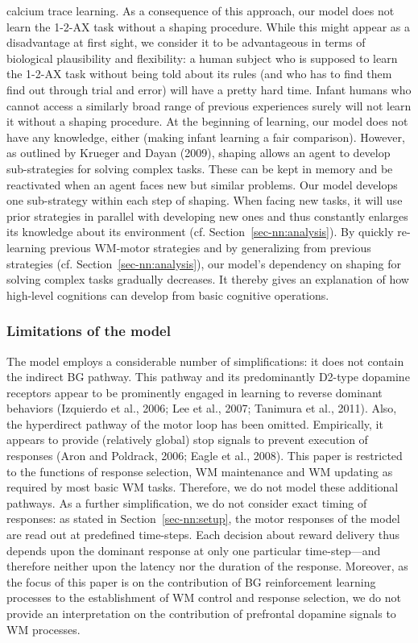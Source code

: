 \documentclass[
  11pt,
  a4paper,
]{scrbook}
\begin{document}
calcium trace learning. As a consequence of this approach, our model
does not learn the 1-2-AX task without a shaping procedure. While this
might appear as a disadvantage at first sight, we consider it to be
advantageous in terms of biological plausibility and flexibility: a
human subject who is supposed to learn the 1-2-AX task without being
told about its rules (and who has to find them find out through trial
and error) will have a pretty hard time. Infant humans who cannot access
a similarly broad range of previous experiences surely will not learn it
without a shaping procedure. At the beginning of learning, our model
does not have any knowledge, either (making infant learning a fair
comparison). However, as outlined by Krueger and Dayan (2009), shaping
allows an agent to develop sub-strategies for solving complex tasks.
These can be kept in memory and be reactivated when an agent faces new
but similar problems. Our model develops one sub-strategy within each
step of shaping. When facing new tasks, it will use prior strategies in
parallel with developing new ones and thus constantly enlarges its
knowledge about its environment (cf. Section~\ref{sec-nn:analysis}). By
quickly re-learning previous WM-motor strategies and by generalizing
from previous strategies (cf. Section~\ref{sec-nn:analysis}), our
model's dependency on shaping for solving complex tasks gradually
decreases. It thereby gives an explanation of how high-level cognitions
can develop from basic cognitive operations.

\subsubsection*{Limitations of the
model}\label{limitations-of-the-model}

The model employs a considerable number of simplifications: it does not
contain the indirect BG pathway. This pathway and its predominantly
D2-type dopamine receptors appear to be prominently engaged in learning
to reverse dominant behaviors (Izquierdo et al., 2006; Lee et al., 2007;
Tanimura et al., 2011). Also, the hyperdirect pathway of the motor loop
has been omitted. Empirically, it appears to provide (relatively global)
stop signals to prevent execution of responses (Aron and Poldrack, 2006;
Eagle et al., 2008). This paper is restricted to the functions of
response selection, WM maintenance and WM updating as required by most
basic WM tasks. Therefore, we do not model these additional pathways. As
a further simplification, we do not consider exact timing of responses:
as stated in Section~\ref{sec-nn:setup}, the motor responses of the
model are read out at predefined time-steps. Each decision about reward
delivery thus depends upon the dominant response at only one particular
time-step---and therefore neither upon the latency nor the duration of
the response. Moreover, as the focus of this paper is on the
contribution of BG reinforcement learning processes to the establishment
of WM control and response selection, we do not provide an
interpretation on the contribution of prefrontal dopamine signals to WM
processes.
\end{document}
